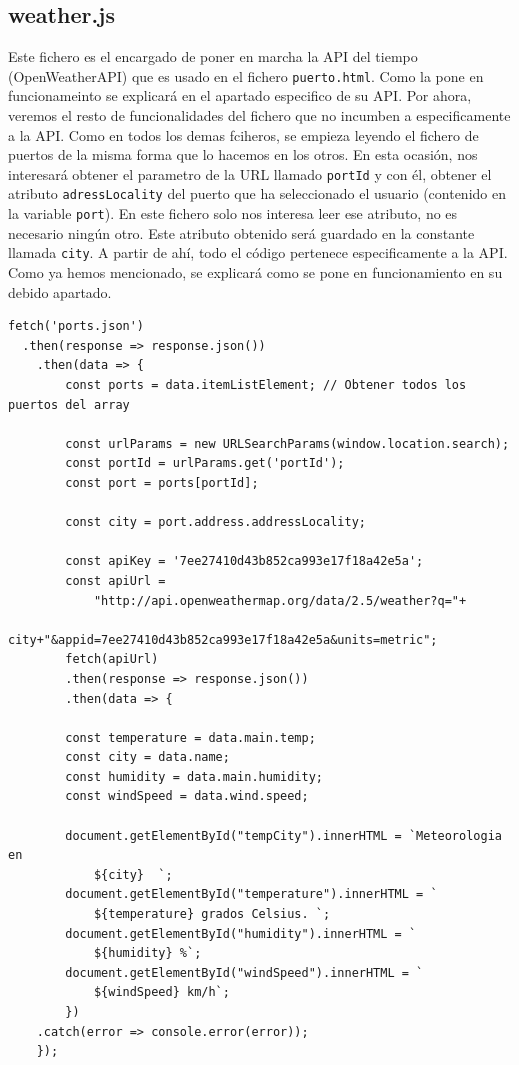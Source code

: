 \documentclass{article}
\begin{document}
\subsection{weather.js}
Este fichero es el encargado de poner en marcha la API del tiempo (OpenWeatherAPI) que es usado en el fichero \texttt{puerto.html}. Como la pone en funcionameinto se explicará en el apartado especifico de su API. Por ahora, veremos el resto de funcionalidades del fichero que no incumben a especificamente a la API. Como en todos los demas fciheros, se empieza leyendo el fichero de puertos de la misma forma que lo hacemos en los otros. En esta ocasión, nos interesará obtener el parametro de la URL llamado \texttt{portId} y con él, obtener el atributo \texttt{adressLocality} del puerto que ha seleccionado el usuario (contenido en la variable \texttt{port}). En este fichero solo nos interesa leer ese atributo, no es necesario ningún otro. Este atributo obtenido será guardado en la constante llamada \texttt{city}. A partir de ahí, todo el código pertenece especificamente a la API. Como ya hemos mencionado, se explicará como se pone en funcionamiento en su debido apartado.
\begin{verbatim}
fetch('ports.json')
  .then(response => response.json())
    .then(data => {
        const ports = data.itemListElement; // Obtener todos los puertos del array
        
        const urlParams = new URLSearchParams(window.location.search);
        const portId = urlParams.get('portId');
        const port = ports[portId];

        const city = port.address.addressLocality;

        const apiKey = '7ee27410d43b852ca993e17f18a42e5a';
        const apiUrl =
            "http://api.openweathermap.org/data/2.5/weather?q="+
            city+"&appid=7ee27410d43b852ca993e17f18a42e5a&units=metric";
        fetch(apiUrl)
        .then(response => response.json())
        .then(data => {
        
        const temperature = data.main.temp;
        const city = data.name;
        const humidity = data.main.humidity;
        const windSpeed = data.wind.speed;

        document.getElementById("tempCity").innerHTML = `Meteorologia en 
            ${city}  `;
        document.getElementById("temperature").innerHTML = `
            ${temperature} grados Celsius. `;
        document.getElementById("humidity").innerHTML = `
            ${humidity} %`;
        document.getElementById("windSpeed").innerHTML = `
            ${windSpeed} km/h`;
        })
    .catch(error => console.error(error));
    });  
\end{verbatim}
\end{document}
